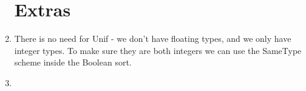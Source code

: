 \documentclass[11pt, oneside]{article}
\begin{document}
\begin{enumerate}
\section{Extras}
\item There is no need for Unif - we don't have floating types, and we only have integer types. To make sure they are both integers we can use the SameType scheme inside the Boolean sort.
\item 

\end{enumerate}
\end{document}
